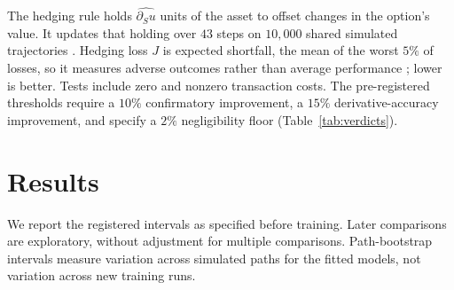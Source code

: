 \documentclass{article}
\begin{document}
The hedging rule holds $\widehat{\partial_Su}$ units of the
asset to offset changes in the option's value. It updates that holding over $43$
steps on $10{,}000$ shared simulated trajectories
\citep{andersen2008simple}. Hedging loss $J$ is expected shortfall, the mean of the
worst $5\%$ of losses, so it measures adverse outcomes rather than average performance
\citep{rockafellar2000optimization}; lower is better.
Tests include zero and nonzero transaction costs. The pre-registered thresholds
require a $10\%$ confirmatory improvement, a $15\%$ derivative-accuracy improvement,
and specify a $2\%$ negligibility floor (Table~\ref{tab:verdicts}).

\section{Results}
\label{sec:results}

We report the registered intervals as specified before training. Later comparisons
are exploratory, without adjustment for multiple comparisons. Path-bootstrap
intervals measure variation across simulated paths for the fitted models, not
variation across new training runs.
\end{document}
